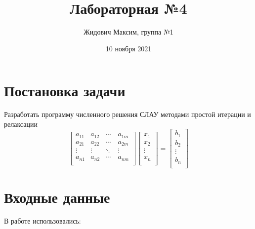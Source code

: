 \documentclass[12pt]{report}
\title{\vspace{-3cm}Лабораторная №4}
\author{Жидович Максим, группа №1}
\date{10 ноября 2021}
\begin{document}
\maketitle

\section{Постановка задачи}

Разработать программу численного решения СЛАУ методами простой итерации и релаксации
\[
\begin{bmatrix}
a_{11} & a_{12}  & \cdots   & a_{1m}   \\
a_{21} & a_{22}  & \cdots   & a_{2m}  \\
\vdots & \vdots  & \ddots   & \vdots  \\
a_{n1} & a_{n2}  & \cdots\  & a_{nm}  \\
\end{bmatrix}
\begin{bmatrix}
x_{1} \\
x_{2} \\
\vdots \\
x_{n} \\
\end{bmatrix}
=
\begin{bmatrix}
b_{1} \\
b_{2} \\
\vdots \\
b_{n} \\
\end{bmatrix}
\]

\section{Входные данные}

В работе использовались:
\end{document}
